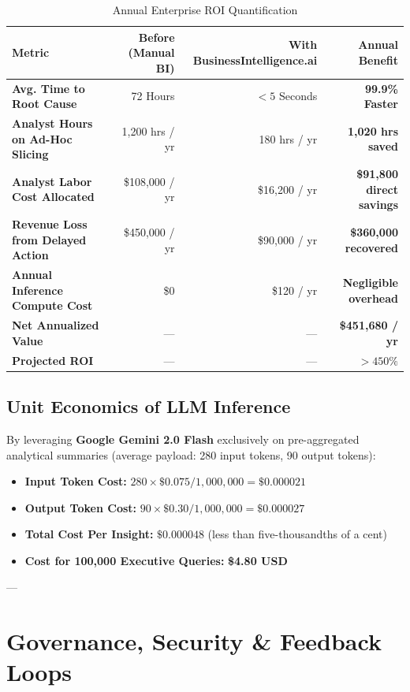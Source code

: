\documentclass[11pt,a4paper]{article}
\begin{document}
\begin{table}[h!]
\centering
\small
\begin{tabularx}{\textwidth}{>{\raggedright\arraybackslash}X r r r}
\toprule
\textbf{Metric} & \textbf{Before (Manual BI)} & \textbf{With BusinessIntelligence.ai} & \textbf{Annual Benefit} \\
\midrule
\textbf{Avg. Time to Root Cause} & 72 Hours & $< 5$ Seconds & \textbf{99.9\% Faster} \\
\textbf{Analyst Hours on Ad-Hoc Slicing} & 1,200 hrs / yr & 180 hrs / yr & \textbf{1,020 hrs saved} \\
\textbf{Analyst Labor Cost Allocated} & \$108,000 / yr & \$16,200 / yr & \textbf{\$91,800 direct savings} \\
\textbf{Revenue Loss from Delayed Action} & \$450,000 / yr & \$90,000 / yr & \textbf{\$360,000 recovered} \\
\textbf{Annual Inference Compute Cost} & \$0 & \$120 / yr & \textbf{Negligible overhead} \\
\midrule
\textbf{Net Annualized Value} & --- & --- & \textbf{\$451,680 / yr} \\
\textbf{Projected ROI} & --- & --- & \textbf{$> 450\%$} \\
\bottomrule
\end{tabularx}
\caption{Annual Enterprise ROI Quantification}
\end{table}

\subsection{Unit Economics of LLM Inference}
By leveraging \textbf{Google Gemini 2.0 Flash} exclusively on pre-aggregated analytical summaries (average payload: 280 input tokens, 90 output tokens):
\begin{itemize}[noitemsep]
    \item \textbf{Input Token Cost:} $280 \times \$0.075 / 1,000,000 = \$0.000021$
    \item \textbf{Output Token Cost:} $90 \times \$0.30 / 1,000,000 = \$0.000027$
    \item \textbf{Total Cost Per Insight:} $\mathbf{\$0.000048}$ (less than five-thousandths of a cent)
    \item \textbf{Cost for 100,000 Executive Queries:} \textbf{\$4.80 USD}
\end{itemize}

---

\section{Governance, Security \& Feedback Loops}
\end{document}

